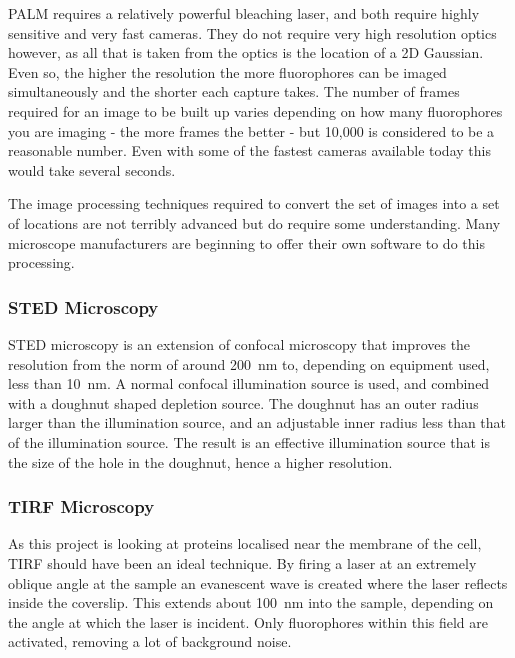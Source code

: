 \documentclass[../main.tex]{subfiles}
\begin{document}
PALM requires a relatively powerful bleaching laser, and both require highly sensitive and very fast cameras. They do not require very high resolution optics however, as all that is taken from the optics is the location of a 2D Gaussian. Even so, the higher the resolution the more fluorophores can be imaged simultaneously and the shorter each capture takes. The number of frames required for an image to be built up varies depending on how many fluorophores you are imaging - the more frames the better - but 10,000 is considered to be a reasonable number. Even with some of the fastest cameras available today this would take several seconds.

The image processing techniques required to convert the set of images into a set of locations are not terribly advanced but do require some understanding. Many microscope manufacturers are beginning to offer their own software to do this processing.

\subsubsection{STED Microscopy}

STED microscopy is an extension of confocal microscopy that improves the resolution from the norm of around \SI{200}{\nano\meter} to, depending on equipment used, less than \SI{10}{\nano\meter}\cite{rittweger09}. A normal confocal illumination source is used, and combined with a doughnut shaped depletion source. The doughnut has an outer radius larger than the illumination source, and an adjustable inner radius less than that of the illumination source. The result is an effective illumination source that is the size of the hole in the doughnut, hence a higher resolution.

\subsubsection{TIRF Microscopy}
As this project is looking at proteins localised near the membrane of the cell, TIRF should have been an ideal technique. By firing a laser at an extremely oblique angle at the sample an evanescent wave is created where the laser reflects inside the coverslip. This extends about \SI{100}{\nano\meter} into the sample, depending on the angle at which the laser is incident. Only fluorophores within this field are activated, removing a lot of background noise.
\end{document}
